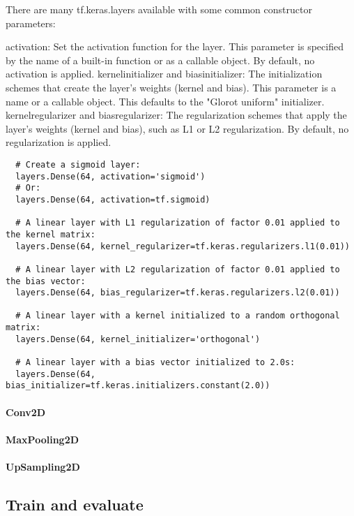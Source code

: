 There are many tf.keras.layers available with some common constructor parameters:

activation: Set the activation function for the layer. This parameter is specified by the name of a built-in function or as a callable object. By default, no activation is applied.
kernelinitializer and biasinitializer: The initialization schemes that create the layer's weights (kernel and bias). This parameter is a name or a callable object. This defaults to the "Glorot uniform" initializer.
kernelregularizer and biasregularizer: The regularization schemes that apply the layer's weights (kernel and bias), such as L1 or L2 regularization. By default, no regularization is applied.


\begin{verbatim}
  # Create a sigmoid layer:
  layers.Dense(64, activation='sigmoid')
  # Or:
  layers.Dense(64, activation=tf.sigmoid)

  # A linear layer with L1 regularization of factor 0.01 applied to the kernel matrix:
  layers.Dense(64, kernel_regularizer=tf.keras.regularizers.l1(0.01))

  # A linear layer with L2 regularization of factor 0.01 applied to the bias vector:
  layers.Dense(64, bias_regularizer=tf.keras.regularizers.l2(0.01))

  # A linear layer with a kernel initialized to a random orthogonal matrix:
  layers.Dense(64, kernel_initializer='orthogonal')

  # A linear layer with a bias vector initialized to 2.0s:
  layers.Dense(64, bias_initializer=tf.keras.initializers.constant(2.0))

\end{verbatim}


\paragraph{Conv2D}

\paragraph{MaxPooling2D}
\paragraph{UpSampling2D}

\subsection{Train and evaluate}

